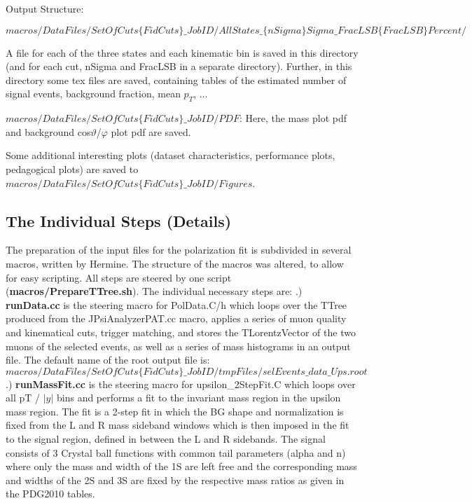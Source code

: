 \documentclass{article}
\begin{document}
Output Structure:

$macros/DataFiles/SetOfCuts\{FidCuts\}\_ JobID/AllStates\_\{nSigma\}Sigma\_FracLSB\{FracLSB\}Percent/$

A file for each of the three states and each kinematic bin is saved in this directory (and for each cut, nSigma and FracLSB in a separate directory). Further, in this directory some tex files are saved, containing tables of the estimated number of signal events, background fraction, mean $p_T$, ...

$macros/DataFiles/SetOfCuts\{FidCuts\}\_JobID/PDF$: Here, the mass plot pdf and background cos$\vartheta$/$\varphi$ plot pdf are saved.

Some additional interesting plots (dataset characteristics, performance plots, pedagogical plots) are saved to $macros/DataFiles/SetOfCuts\{FidCuts\}\_JobID/Figures$.

\subsection{The Individual Steps (Details)}

The preparation of the input files for the polarization fit is subdivided in several macros, written by Hermine. The structure of the macros was altered, to allow for easy scripting. All steps are steered by one script ({\bf macros/PrepareTTree.sh}). The individual necessary steps are:
\newline
{}.) {\bf runData.cc} is the steering macro for PolData.C/h which loops over
the TTree produced from the JPsiAnalyzerPAT.cc macro, applies a series
of muon quality and kinematical cuts, trigger matching, and stores the TLorentzVector of
the two muons of the selected events, as well as a series of mass
histograms in an output file. The default name of the root output file is:
\newline
\newline
	   $macros/DataFiles/SetOfCuts\{FidCuts\}\_JobID/tmpFiles/selEvents\_data\_Ups.root$
\newline
{}.) {\bf runMassFit.cc} is the steering macro for upsilon\_2StepFit.C which
loops over all pT / $|y|$ bins and performs a fit to the invariant mass
region in the upsilon mass region. The fit is a 2-step fit in which
the BG shape and normalization is fixed from the L and R mass sideband
windows which is then imposed in the fit to the signal region, defined
in between the L and R sidebands. The signal consists of 3 Crystal ball
functions with common tail parameters (alpha and n) where only the
mass and width of the 1S are left free and the corresponding mass and
widths of the 2S and 3S are fixed by the respective mass ratios as
given in the PDG2010 tables. 
\end{document}
